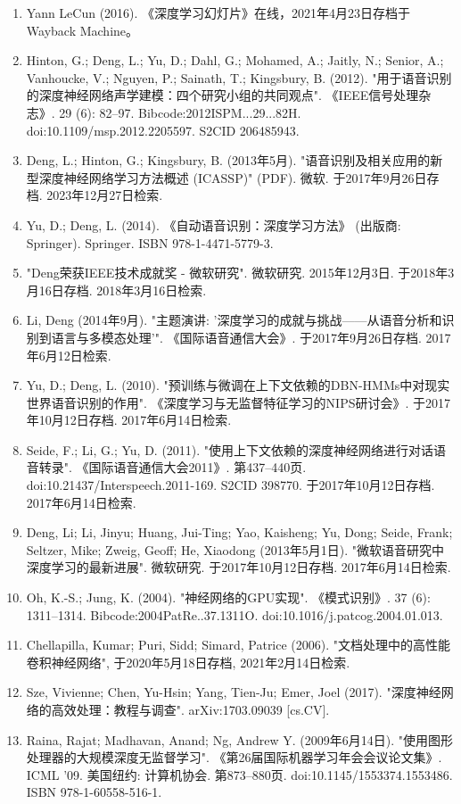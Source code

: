 \begin{enumerate}
\item Yann LeCun (2016). 《深度学习幻灯片》在线，2021年4月23日存档于Wayback Machine。
\item Hinton, G.; Deng, L.; Yu, D.; Dahl, G.; Mohamed, A.; Jaitly, N.; Senior, A.; Vanhoucke, V.; Nguyen, P.; Sainath, T.; Kingsbury, B. (2012). "用于语音识别的深度神经网络声学建模：四个研究小组的共同观点". 《IEEE信号处理杂志》. 29 (6): 82–97. Bibcode:2012ISPM...29...82H. doi:10.1109/msp.2012.2205597. S2CID 206485943.
\item Deng, L.; Hinton, G.; Kingsbury, B. (2013年5月). "语音识别及相关应用的新型深度神经网络学习方法概述 (ICASSP)" (PDF). 微软. 于2017年9月26日存档. 2023年12月27日检索.
\item Yu, D.; Deng, L. (2014). 《自动语音识别：深度学习方法》 (出版商: Springer). Springer. ISBN 978-1-4471-5779-3.
\item "Deng荣获IEEE技术成就奖 - 微软研究". 微软研究. 2015年12月3日. 于2018年3月16日存档. 2018年3月16日检索.
\item Li, Deng (2014年9月). "主题演讲: '深度学习的成就与挑战——从语音分析和识别到语言与多模态处理'". 《国际语音通信大会》. 于2017年9月26日存档. 2017年6月12日检索.
\item Yu, D.; Deng, L. (2010). "预训练与微调在上下文依赖的DBN-HMMs中对现实世界语音识别的作用". 《深度学习与无监督特征学习的NIPS研讨会》. 于2017年10月12日存档. 2017年6月14日检索.
\item Seide, F.; Li, G.; Yu, D. (2011). "使用上下文依赖的深度神经网络进行对话语音转录". 《国际语音通信大会2011》. 第437–440页. doi:10.21437/Interspeech.2011-169. S2CID 398770. 于2017年10月12日存档. 2017年6月14日检索.
\item Deng, Li; Li, Jinyu; Huang, Jui-Ting; Yao, Kaisheng; Yu, Dong; Seide, Frank; Seltzer, Mike; Zweig, Geoff; He, Xiaodong (2013年5月1日). "微软语音研究中深度学习的最新进展". 微软研究. 于2017年10月12日存档. 2017年6月14日检索.
\item Oh, K.-S.; Jung, K. (2004). "神经网络的GPU实现". 《模式识别》. 37 (6): 1311–1314. Bibcode:2004PatRe..37.1311O. doi:10.1016/j.patcog.2004.01.013.
\item Chellapilla, Kumar; Puri, Sidd; Simard, Patrice (2006). "文档处理中的高性能卷积神经网络", 于2020年5月18日存档, 2021年2月14日检索.
\item Sze, Vivienne; Chen, Yu-Hsin; Yang, Tien-Ju; Emer, Joel (2017). "深度神经网络的高效处理：教程与调查". arXiv:1703.09039 [cs.CV].
\item Raina, Rajat; Madhavan, Anand; Ng, Andrew Y. (2009年6月14日). "使用图形处理器的大规模深度无监督学习". 《第26届国际机器学习年会会议论文集》. ICML '09. 美国纽约: 计算机协会. 第873–880页. doi:10.1145/1553374.1553486. ISBN 978-1-60558-516-1.

\end{enumerate}
